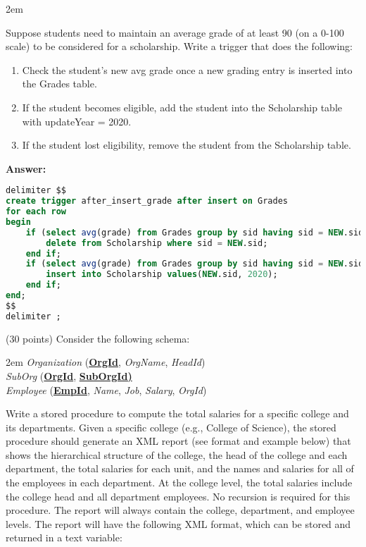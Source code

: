 \begin{questions}
\begin{addmargin}[1em]{2em}
\end{addmargin}
Suppose students need to maintain an average grade of at least 90 (on a 0-100 scale) to be considered for a scholarship. Write a trigger that does the following: \\
\begin{enumerate}
    \item Check the student's new avg grade once a new grading entry is inserted into the Grades table.
    \item If the student becomes eligible, add the student into the Scholarship table with updateYear = 2020. 
    \item If the student lost eligibility, remove the student from the Scholarship table. 
\end{enumerate}

\textbf{Answer:}
\begin{lstlisting}[language=SQL]
delimiter $$
create trigger after_insert_grade after insert on Grades
for each row
begin
    if (select avg(grade) from Grades group by sid having sid = NEW.sid) < 90 AND exists(select * from Scholarship where sid = NEW.sid) then
        delete from Scholarship where sid = NEW.sid;
    end if;
    if (select avg(grade) from Grades group by sid having sid = NEW.sid) >= 90 AND not exists(select * from Scholarship where sid = NEW.sid) then
        insert into Scholarship values(NEW.sid, 2020);
    end if;
end;
$$
delimiter ;
\end{lstlisting}

\question (30 points) Consider the following schema:
\begin{addmargin}[1em]{2em}%
    \textit{Organization} (\textbf{\underline{OrgId}},  \textit{OrgName}, \textit{HeadId})\\
    \textit{SubOrg} (\textbf{\underline{OrgId}}, \textbf{\underline{SubOrgId)}}\\
    \textit{Employee} (\textbf{\underline{EmpId}}, \textit{Name}, \textit{Job}, \textit{Salary}, \textit{OrgId})
\end{addmargin}

Write a stored procedure to compute the total salaries for a specific college and its departments. Given a specific college (e.g., College of Science), the stored procedure should generate an XML report (see format and example below) that shows the hierarchical structure of the college, the head of the college and each department, the total salaries for each unit, and the names and salaries for all of the employees in each department. At the college level, the total salaries include the college head and all department employees. No recursion is required for this procedure. The report will always contain the college, department, and employee levels. The report will have the following XML format, which can be stored and returned in a text variable:


\end{questions}
